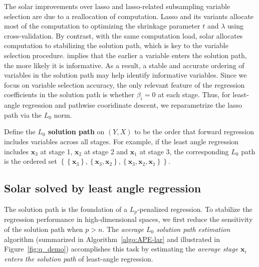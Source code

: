 \documentclass[11pt,authoryear]{elsarticle}
\begin{document}
The solar improvements over lasso and lasso-related subsampling variable selection are due to a reallocation of computation. Lasso and its variants allocate most of the computation to optimizing the shrinkage parameter $t$ and $\lambda$ using cross-validation. By contrast, with the same computation load, solar allocates computation to stabilizing the solution path, which is key to the variable selection procedure. \citet[Theorem~2]{zhang09} implies that the earlier a variable enters the solution path, the more likely it is informative. As a result, a stable and accurate ordering of variables in the solution path may help identify informative variables. Since we focus on variable selection accuracy, the only relevant feature of the regression coefficients in the solution path is whether $\beta_i = 0$ at each stage. Thus, for least-angle regression and pathwise cooridinate descent, we reparametrize the lasso path via the $L_0$ norm.
%
\begin{definition}
  Define the \textbf{$L_0$ solution path} on $\left( Y, X \right)$ to be the order that forward regression includes variables across all stages. For example, if the least angle regression includes $\mathbf{x}_3$ at stage 1, $\mathbf{x}_2$ at stage 2 and $\mathbf{x}_1$ at stage 3, the corresponding $L_0$ path is the ordered set $\left\{ \left\{\mathbf{x}_3 \right\}, \left\{ \mathbf{x}_3, \mathbf{x}_2 \right\}, \left\{ \mathbf{x}_3, \mathbf{x}_2, \mathbf{x}_1 \right\} \right\}$.
  \label{def:solution_path}
\end{definition}

\subsection{Solar solved by least angle regression}

The solution path is the foundation of a $L_p$-penalized regression. To stabilize the regression performance in high-dimensional spaces, we first reduce the sensitivity of the solution path when $p > n$. The \emph{average $L_0$ solution path estimation} algorithm (summarized in Algorithm~\ref{algo:APE-lar} and illustrated in Figure~\ref{fig:q_demo}) accomplishes this task by estimating the \emph{average stage $\mathbf{x}_i$ enters the solution path} of least-angle regression.
\end{document}
